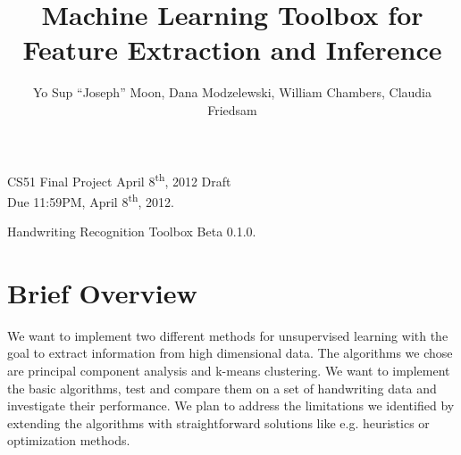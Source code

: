 \documentclass[12pt]{article} %
\title{Machine Learning Toolbox for Feature Extraction and Inference}
\author{Yo Sup ``Joseph'' Moon, Dana Modzelewski, William Chambers, Claudia Friedsam}
\begin{document}
\maketitle


\begin{center}
CS51 Final Project April 8\textsuperscript{th}, 2012 Draft \\
Due 11:59PM, April 8\textsuperscript{th}, 2012.  
\end{center}

\begin{center}
Handwriting Recognition Toolbox Beta 0.1.0.
\end{center}

\section{Brief Overview}
 
We want to implement two different methods for unsupervised learning with the goal to extract information from high dimensional data. The algorithms we chose are principal component analysis and k-means clustering.
We want to implement the basic algorithms, test and compare them on a set of handwriting data and investigate their performance. 
We plan to address the limitations we identified by extending the algorithms with straightforward solutions like e.g. heuristics or optimization methods.  
\end{document}

